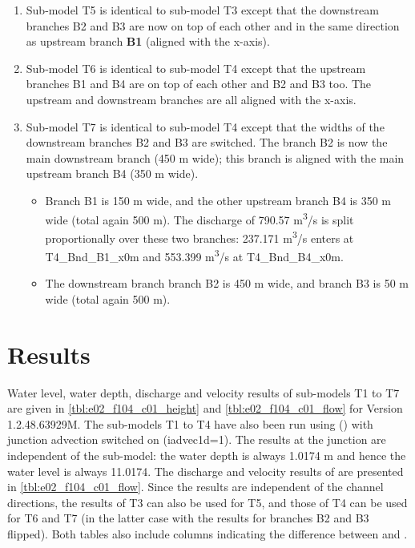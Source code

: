 \begin{enumerate}
		\Note The main downstream branch B3 (450 m wide) is not aligned with the main upstream branch B4 (350 m wide); compare sub-model T7.

	\item Sub-model T5 is identical to sub-model T3 except that the downstream branches B2 and B3 are now on top of each other and in the same direction as upstream branch \textbf{B1} (aligned with the x-axis).

	\item Sub-model T6 is identical to sub-model T4 except that the upstream branches B1 and B4 are on top of each other and B2 and B3 too.
	The upstream and downstream branches are all aligned with the x-axis.

	\item Sub-model T7 is identical to sub-model T4 except that the widths of the downstream branches B2 and B3 are switched.
	The branch B2 is now the main downstream branch (450 m wide); this branch is aligned with the main upstream branch B4 (350 m wide).
		\begin{itemize}
			\item Branch B1 is 150 m wide, and the other upstream branch B4 is 350 m wide (total again 500 m).
			The discharge of 790.57 m\textsuperscript{3}/s is split proportionally over these two branches: 237.171 m\textsuperscript{3}/s enters at T4\_Bnd\_B1\_x0m and 553.399 m\textsuperscript{3}/s at T4\_Bnd\_B4\_x0m.
			\item The downstream branch branch B2 is 450 m wide, and branch B3 is 50 m wide (total again 500 m).
		\end{itemize}
	\end{enumerate}


\section*{Results}
Water level, water depth, discharge and velocity results of sub-models T1 to T7 are given in \autoref{tbl:e02_f104_c01_height} and \autoref{tbl:e02_f104_c01_flow} for \dflowfm Version 1.2.48.63929M.
The sub-models T1 to T4 have also been run using \sobekthree (\dflowoned) with junction advection switched on (iadvec1d=1).
The \dflowoned results at the junction are independent of the sub-model: the water depth is always 1.0174 m and hence the water level is always 11.0174.
The discharge and velocity results of \dflowoned are presented in \autoref{tbl:e02_f104_c01_flow}.
Since the \dflowoned results are independent of the channel directions, the \dflowoned results of T3 can also be used for T5, and those of T4 can be used for T6 and T7 (in the latter case with the results for branches B2 and B3 flipped).
Both tables also include columns indicating the difference between \dflowfm and \dflowoned.


